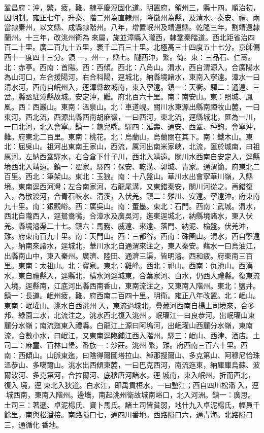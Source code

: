 \begin{pinyinscope}
鞏昌府：沖，繁，疲，難。隸平慶涇固化道。明置府，領州三，縣十四。順治初，因明制。雍正七年，升秦、階二州為直隸州，降徽州為縣，及清水、秦安、禮、兩當隸秦州，以文縣、成縣隸階州。八年，增置岷州及靖遠縣。乾隆三年，割靖遠隸蘭州。十三年，改洮州衛為來屬，旋並漳縣入隴西，隸鞏秦階道。西北距省治四百二十里。廣二百九十五里，袤千二百三十里。北極高三十四度五十七分。京師偏西十一度四十三分。領一，州一，縣七。隴西沖，繁。倚。東：三品石、仁壽。北：赤亭。西南：首陽。西：西傾。西北：八角山。渭水，西自渭源入，合廣陽水為山河口，左合援陽河，右合科陽，逕城北，納縣境諸水，東南入寧遠。漳水一曰清水河，西南自岷州入，逕漳縣故城南，東入寧遠。鎮一：天衢。驛二：通遠、三岔。縣丞駐漳縣故城。安定沖，難。府北百六十里。南：南安山。東：照城、鳳凰。西：西巖山。東南：溫泉山。北：車道峴。關川水東源出縣南禪牧山麓，一曰東河，西北流，西源出縣西南胡麻嶺，一曰西河，東北流，逕縣城北，匯為一川，一曰北河，北入會寧。鎮一：龜兒嘴。驛四：延壽、通安、西鞏、秤鉤。會寧沖，難。府東北二百里。東南：桃花。北：烏蘭山，烏蘭關在其下。南：鐵木山。東北：屈吳山。祖河出東南王家山，西流，厲河出南米家峽，北流，匯於城南，曰祖厲河。左納西鞏驛水，右合倉下什子川，西北入靖遠。關川水西南自安定入，逕縣境西北入靖遠。鎮一：翟家。驛四：保安、乾溝、郭城、青家。通渭簡。府東北二百里。西北：筆架山。東北：玉狼。南：十八盤山。華川水出會寧華川嶺，入縣境。東南逕西河灣；左合南家河，右龍尾溝，又東錯秦安，關川河從之。再錯復入，為散渡河，合青石峽水、清溪，入伏羌。鎮二：雞川、安遠。寧遠沖。府東南九十里。南：銀觀峪。西：廣吳山。南：董墨。東北：石門。西南：武城。渭水，西北自隴西入，逕鴛鴦嘴，合漳水及廣吳河，迤東逕城北，納縣境諸水，東入伏羌。縣境濬渠二十七。鎮六：馬務、威遠、來遠、落門、納泥、榆盤。伏羌沖，難。府東南百九十里。南：天門山。西：三都谷。西南：硃圉山。渭水，西自寧遠入，納南來諸水，逕城北，華川水北自通渭來注之，東入秦安。藉水一曰烏油江，出縣南山中，東入秦州。廣濟、陸田、通濟三渠，皆明濬。西和疲。府東南三百里。東南：太祖山。北：寶泉。東北：雞峰。西北：祁山。西南：仇池山。西漢水，東自禮縣入，逕縣北，橫水河逕城東，合葉家河、白水，仍西入禮縣。復東流入境，逕縣南，江底河出縣西南香山，東南流注之，又東南入階州。東北：鹽井。鎮一：長道。岷州疲，難。府西南二百四十里。明衛。雍正八年改置。北：岷山。東南：岷瓘山。洮水自西洮州入，東流過城北，疊藏河西南自楊土司境來，合多邦、綠園二水，北流注之。洮水西北復入洮州。岷瓘江一曰良恭河，出岷瓘山東麓分水嶺；南流迤東入禮縣。白龍江上源曰阿塢河，出岷瓘山西麓分水嶺，東南流，合數小水，曰岷江，又東南逕臨鋪江西入階州。驛三：岷山、西津、酒店。土司二：麻童、百林口堡。番族一：沙莊。洮州繁，難。府西南三百六十里。西南：西傾山。山脈東迤，曰陰得爾圖塔拉山、綽那搜爾山、多克第山、阿穆尼恰珠溫恭山、多噶爾山。洮水出西傾東麓，一曰巴克西河，南流迤東，納庫庫烏蘇、波爾波河、多克第河，合拉爾河、底穆唐河諸水，逕城南，東入岷州，折而西北，復入境，逕東北入狄道。白水江，即禹貢桓水，一曰墊江；西自四川松潘入，逕城西南，東南入階州。邊墻，南起洮州衛故城南峪口，北入河洲。鎮一：廣思。土司三：著遜、卓泥楊氏、資卜馬氏。諸土司皆貧弱，地什九入卓泥楊氏，幅員千餘里，南與松潘接。南路隘口七，通四川番地。西路隘口六，通青海。北路隘口三，通循化番地。


\end{pinyinscope}
